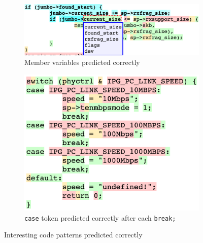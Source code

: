 \begin{figure}
\begin{subfigure}{\linewidth}
  \includegraphics[width=\linewidth]{figs/example7.png}
  \caption{Member variables predicted correctly}
  \label{fig:memvar}
\end{subfigure}
\begin{subfigure}{\linewidth}
  \includegraphics[width=0.6\linewidth]{figs/example1.png}
  \caption{{\tt case} token predicted correctly after each {\tt break;}}
  \label{fig:breakcase}
\end{subfigure}
  \caption{Interesting code patterns predicted correctly}
  \label{fig:ifpattern}
\end{figure}

